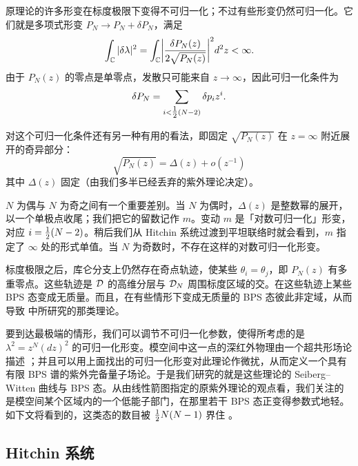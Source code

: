 原理论的许多形变在标度极限下变得不可归一化；不过有些形变仍然可归一化。它们就是多项式形变 $P_N \to P_N + \delta P_N$，满足
\begin{equation}\label{eq:ch11-normaliz}
\int_{\mathbb{C}} \vert \delta \lambda \vert^2 = \int_{\mathbb{C}} \biggl\vert
\frac{\delta P_N(z) }{2 \sqrt{P_N(z)}} \biggr\vert^2 d^2 z < \infty.
\end{equation}
由于 $P_N(z)$ 的零点是单零点，发散只可能来自 $z \to \infty$，因此可归一化条件为
\begin{equation}\label{eq:ch11-deltaP}
\delta P_N = \sum_{i < \tfrac{1}{2}(N-2)} \delta p_i z^i.
\end{equation}

对这个可归一化条件还有另一种有用的看法，即固定 $\sqrt{P_N(z)}$ 在 $z = \infty$ 附近展开的奇异部分：
\begin{equation}\label{eq:AsympOfP}
\sqrt{P_N(z)} = \Delta(z) + o(z^{-1})
\end{equation}
其中 $\Delta(z)$ 固定（由我们多半已经丢弃的紫外理论决定）。

$N$ 为偶与 $N$ 为奇之间有一个重要差别。当 $N$ 为偶时，$\Delta(z)$ 是整数幂的展开，以一个单极点收尾；我们把它的留数记作 $m$。变动 $m$ 是「对数可归一化」形变，对应 $i = \tfrac{1}{2}(N-2)$。稍后我们从 Hitchin 系统过渡到平坦联络时就会看到，$m$ 指定了 $\infty$ 处的形式单值。当 $N$ 为奇数时，不存在这样的对数可归一化形变。

标度极限之后，库仑分支上仍然存在奇点轨迹，使某些 $\theta_i = \theta_j$，即 $P_N(z)$ 有多重零点。这些轨迹是 $\mathcal{D}$ 的高维分层与 $\mathcal{D}_N$ 周围标度区域的交。在这些轨迹上某些 BPS 态变成无质量。而且，在有些情形下变成无质量的 BPS 态彼此非定域，从而导致 \cite{Argyres:1995jj,Argyres:1995xn} 中所研究的那类理论。

要到达最极端的情形，我们可以调节不可归一化参数，使得所考虑的是 $\lambda^2 = z^N (dz)^2$ 的可归一化形变。模空间中这一点的深红外物理由一个超共形场论描述 \cite{Argyres:1995jj,Argyres:1995xn}；并且可以用上面找出的可归一化形变对此理论作微扰，从而定义一个具有有限 BPS 谱的紫外完备量子场论。于是我们研究的就是这些理论的 Seiberg–Witten 曲线与 BPS 态。从由线性箭图指定的原紫外理论的观点看，我们关注的是模空间某个区域内的一个低能子部门，在那里若干 BPS 态正变得参数式地轻。如下文将看到的，这类态的数目被 $\tfrac{1}{2} N(N-1)$ 界住 \cite{Shapere:1999xr}。

\subsection{Hitchin 系统}\label{subsec:HitchinForAD}

